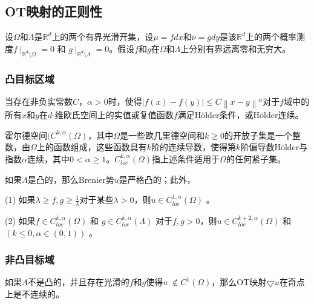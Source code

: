 \subsection{OT映射的正则性}

设$\Omega$和$\Lambda$是$\mathbb{R}^d$上的两个有界光滑开集，设$\mu=fdx$和$\nu=gdy$是该$\mathbb{R}^d$上的两个概率测度$f\mid _{\mathbb{R}^d \setminus \Omega }=0$ 和 $g\mid _{\mathbb{R}^d \setminus \Lambda }=0$。假设$f$和$g$在$\Omega$和$\Lambda$上分别有界远离零和无穷大。

\subsubsection{凸目标区域}

\begin{definition}[Hölder连续]\label{definition:3.5}
	当存在非负实常数$C$，$\alpha>0$时，使得$\left | f(x)-f(y) \right | \le C \left \| x-y \right \|^{\alpha }$对于$f$域中的所有$x$和$y$在$d$-维欧氏空间上的实值或复值函数$f$满足Hölder条件，或Hölder连续。
\end{definition}

\begin{definition}[Hölder空间]	\label{definition:3.6}
	霍尔德空间$(C^{k,\alpha}(\Omega)$，其中$\Omega$是一些欧几里德空间和$k \ge 0$的开放子集是一个整数，由$\Omega$上的函数组成，这些函数具有$k$阶的连续导数，使得第$k$阶偏导数Hölder与指数$\alpha$连续，其中$0<\alpha \ge 1$。$C_{loc} ^{k,\alpha} (\Omega)$指上述条件适用于$\Omega$的任何紧子集。
\end{definition}

\begin{theorem}[Caffarelli【45】]	\label{theorem:3.4}
	如果$\Lambda$是凸的，那么Brenier势$u$是严格凸的；此外，
	
	(1) 如果$\lambda \ge f, g \ge \frac{1}{\lambda}$对于某些$\lambda>0$，则$u \in C_{loc} ^{1,\alpha} (\Omega)$ 。
	
	(2) 如果$f \in C_{loc} ^{k,\alpha} (\Omega)$ 和 $g \in C_{loc} ^{k,\alpha} (\Lambda)$ 对于$f,g>0$，则$u \in C_{loc} ^{k+2,\alpha} (\Omega)$ 和 $(k \le 0, \alpha \in(0,1))$ 。
\end{theorem}

\subsubsection{非凸目标域}

如果$\Lambda$不是凸的，并且存在光滑的$f$和$g$使得$u \notin C^1 (\Omega)$，那么OT映射$\bigtriangledown u$在奇点上是不连续的。


